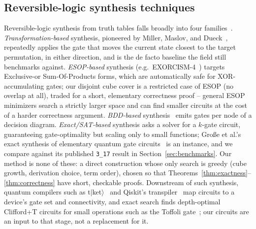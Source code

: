 \documentclass[conference]{IEEEtran}
\theoremstyle{plain}
\begin{document}
\subsection{Reversible-logic synthesis techniques}
Reversible-logic synthesis from truth tables falls broadly into four
families~\cite{saeedi2013}. \emph{Transformation-based} synthesis, pioneered by Miller,
Maslov, and Dueck~\cite{miller2003}, repeatedly applies the gate that
moves the current state closest to the target permutation, in either
direction, and is the de facto baseline the field still benchmarks
against. \emph{ESOP-based} synthesis (e.g.\ EXORCISM-4~\cite{mishchenko2001})
targets Exclusive-or Sum-Of-Products forms, which are automatically safe
for XOR-accumulating gates; our disjoint cube cover is a restricted case
of ESOP (no overlap at all), traded for a short, elementary correctness
proof -- general ESOP minimizers search a strictly larger space and can
find smaller circuits at the cost of a harder correctness argument.
\emph{BDD-based} synthesis~\cite{wille2009bdd} emits
gates per node of a decision diagram. \emph{Exact/SAT-based} synthesis
asks a solver for a $k$-gate circuit, guaranteeing gate-optimality but
scaling only to small functions; Gro{\ss}e et al.'s exact synthesis of
elementary quantum gate circuits~\cite{grosse2008} is an instance, and we
compare against its published \texttt{3\_17} result in
Section~\ref{sec:benchmarks}. Our method is none of these: a direct
construction whose only search is greedy (cube growth, derivation choice,
term order), chosen so that
Theorems~\ref{thm:exactness}--\ref{thm:correctness} have short, checkable
proofs. Downstream of such synthesis, quantum compilers such as
t$|$ket$\rangle$~\cite{sivarajah2020} and Qiskit's
transpiler~\cite{qiskit2024} map circuits to a device's gate set and
connectivity, and exact search finds depth-optimal Clifford+T circuits for
small operations such as the Toffoli gate~\cite{amy2013}; our circuits
are an input to that stage, not a replacement for it.
\end{document}
